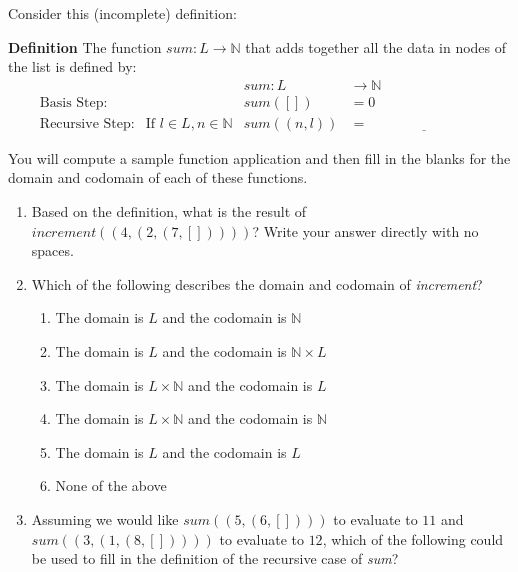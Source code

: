 \documentclass[12pt, oneside]{article}
\begin{document}
\begin{enumerate}
Consider this (incomplete) definition:

{\bf Definition} The function $\textit{sum} : L \to \mathbb{N}$ that adds 
together all the data in nodes of the list is defined by:
\[
\begin{array}{llll}
& & \textit{sum} : L & \to \mathbb{N} \\
\textrm{Basis Step:} & & \textit{sum}([]) & = 0 \\
\textrm{Recursive Step:} & \textrm{If } l \in L, n \in \mathbb{N} & \textit{sum}((n, l)) & = \underline{\hspace{8em}}
\end{array}
\]

You will compute a sample function application and then fill in the 
blanks for the domain and codomain of each of these functions.

\begin{enumerate}
    \item Based on the definition, what is the result of $\textit{increment}((4, (2, (7, []))))$? Write your answer directly with no spaces.
    
    \item Which of the following describes the domain and codomain of \textit{increment}?
    
    \begin{multicols}{2}
    \begin{enumerate}
        \item The domain is $L$ and the codomain is $\mathbb{N}$
        \item The domain is $L$ and the codomain is $\mathbb{N} \times L$
        \item The domain is $L \times \mathbb{N}$ and the codomain is $L$
        \item The domain is $L \times \mathbb{N}$ and the codomain is $\mathbb{N}$
        \item The domain is $L$ and the codomain is $L$
        \item None of the above
    \end{enumerate}
    \end{multicols}
    
    \item Assuming we would like $sum((5, (6, [])))$ to evaluate to $11$ and $sum((3, (1, (8, []))))$ to evaluate to $12$, which of the following could be used to fill in the definition of the recursive case of \textit{sum}?
    

\end{enumerate}
\end{enumerate}
\end{document}
